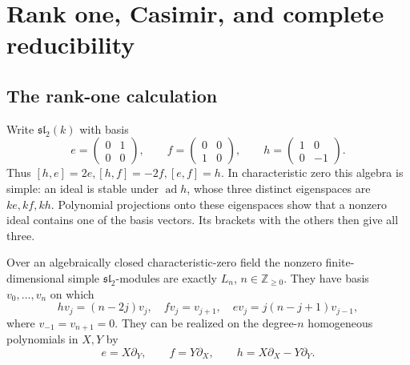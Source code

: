 \chapter{Rank one, Casimir, and complete reducibility}
\label{ch:rank-one}

\section{The rank-one calculation}

Write \(\mathfrak{sl}_2(k)\) with basis
\[
 e=\begin{pmatrix}0&1\\0&0\end{pmatrix},\qquad
 f=\begin{pmatrix}0&0\\1&0\end{pmatrix},\qquad
 h=\begin{pmatrix}1&0\\0&-1\end{pmatrix}.
\]
Thus \([h,e]=2e,[h,f]=-2f,[e,f]=h\). In characteristic
zero this algebra is simple: an ideal is stable under
\(\operatorname{ad}h\), whose three distinct eigenspaces
are \(ke,kf,kh\). Polynomial projections onto these
eigenspaces show that a nonzero ideal contains one of
the basis vectors. Its brackets with the others then
give all three.

\begin{theorem}\label{res:C01}
Over an algebraically closed characteristic-zero field
the nonzero finite-dimensional simple
\(\mathfrak{sl}_2\)-modules are exactly \(L_n\),
\(n\in\mathbb Z_{\geq0}\). They have basis
\(v_0,\ldots,v_n\) on which
\[
 hv_j=(n-2j)v_j,\quad
 fv_j=v_{j+1},\quad
 ev_j=j(n-j+1)v_{j-1},
 \tag{3.1}\label{eq:sl2-basis}
\]
where \(v_{-1}=v_{n+1}=0\). They can be realized on
the degree-\(n\) homogeneous polynomials in \(X,Y\) by
\[
 e=X\partial_Y,\qquad f=Y\partial_X,\qquad
 h=X\partial_X-Y\partial_Y.
\]
\end{theorem}

